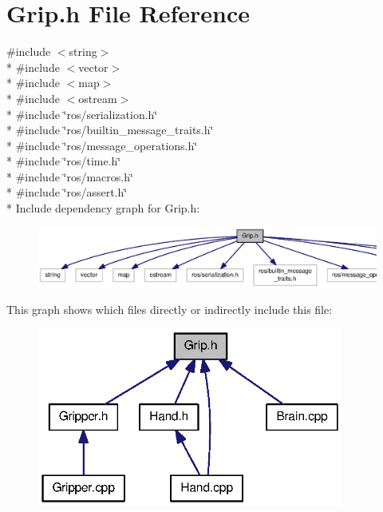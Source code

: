 \section{Grip.\-h File Reference}
\label{Grip_8h}
{\ttfamily \#include $<$string$>$}\\*
{\ttfamily \#include $<$vector$>$}\\*
{\ttfamily \#include $<$map$>$}\\*
{\ttfamily \#include $<$ostream$>$}\\*
{\ttfamily \#include \char`\"{}ros/serialization.\-h\char`\"{}}\\*
{\ttfamily \#include \char`\"{}ros/builtin\-\_\-message\-\_\-traits.\-h\char`\"{}}\\*
{\ttfamily \#include \char`\"{}ros/message\-\_\-operations.\-h\char`\"{}}\\*
{\ttfamily \#include \char`\"{}ros/time.\-h\char`\"{}}\\*
{\ttfamily \#include \char`\"{}ros/macros.\-h\char`\"{}}\\*
{\ttfamily \#include \char`\"{}ros/assert.\-h\char`\"{}}\\*
Include dependency graph for Grip.\-h\-:\nopagebreak
\begin{figure}[H]
\begin{center}
\leavevmode
\includegraphics[width=350pt]{Grip_8h__incl}
\end{center}
\end{figure}
This graph shows which files directly or indirectly include this file\-:\nopagebreak
\begin{figure}[H]
\begin{center}
\leavevmode
\includegraphics[width=285pt]{Grip_8h__dep__incl}
\end{center}
\end{figure}
